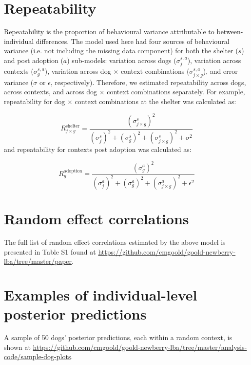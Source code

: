 \documentclass[12pt]{article}
\begin{document}
\newpage
\section{Repeatability}
Repeatability is the proportion of behavioural variance attributable to between-individual differences. The model used here had four sources of behavioural variance (i.e. not including the missing data component) for both the shelter ($s$) and post adoption ($a$) sub-models: variation across dogs ($\sigma_{j}^{s,a}$), variation across contexts ($\sigma_{g}^{s,a}$), variation across dog $\times$ context combinations ($\sigma_{j \times g}^{s,a}$), and error variance ($\sigma$ or $\epsilon$, respectively). Therefore, we estimated repeatability across dogs, across contexts, and across dog $\times$ context combinations separately. For example, repeatability for dog $\times$ context combinations at the shelter was calculated as:

\begin{equation}
  R_{j \times g}^{\text{shelter}} = \frac{(\sigma_{j \times g}^{s})^2}{(\sigma_{j}^{s})^2 + (\sigma_{g}^{s})^2 + (\sigma_{j \times g}^{s})^2 + \sigma^2}
\end{equation}
%
and repeatability for contexts post adoption was calculated as:

\begin{equation}
  R_{g}^{\text{adoption}} = \frac{(\sigma_{g}^{a})^2}{(\sigma_{j}^{a})^2 + (\sigma_{g}^{a})^2 + (\sigma_{j \times g}^{a})^2 + \epsilon^2}
\end{equation}

\newpage
\section{Random effect correlations}
The full list of random effect correlations estimated by the above model is presented in Table S1 found at \href{https://github.com/cmgoold/goold-newberry-lba/tree/master/paper}{https://github.com/cmgoold/goold-newberry-lba/tree/master/paper}.

\section{Examples of individual-level posterior predictions}
A sample of 50 dogs' posterior predictions, each within a random context, is shown at \href{https://github.com/cmgoold/goold-newberry-lba/tree/master/analysis-code/sample-dog-plots}{https://github.com/cmgoold/goold-newberry-lba/tree/master/analysis-code/sample-dog-plots}. 
\end{document}
